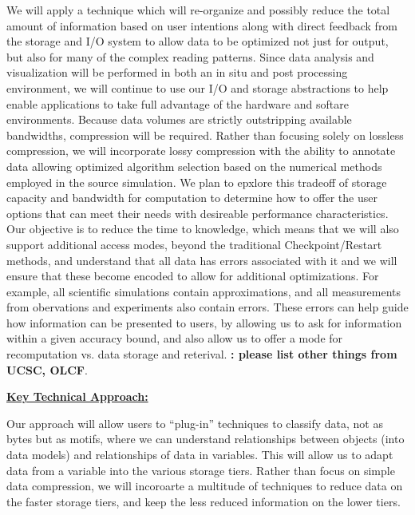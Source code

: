 \documentclass[11pt,letterpaper]{article}
\begin{document}
%
We will apply a technique which will re-organize and possibly reduce the total amount of information based on user intentions along
with direct feedback from the storage and I/O system to allow data to be optimized not just for output, but also for many of the complex
reading patterns. Since data analysis and visualization will be performed in both an in situ and post processing environment, 
we will continue to use our I/O and storage abstractions to help enable applications to take full advantage of the hardware and softare 
environments. Because data volumes are strictly outstripping available bandwidths, compression will
be required. Rather than focusing solely on lossless compression, we will
incorporate lossy compression with the ability to annotate data allowing
optimized algorithm selection based on the numerical methods employed in the
source simulation. We plan to epxlore this tradeoff of storage capacity and
bandwidth for computation to determine how to offer the user options that can
meet their needs with desireable performance characteristics.
%
Our objective is to reduce the time to knowledge, which means that we will also support additional access modes, beyond the traditional 
Checkpoint/Restart methods, and understand that all data has errors associated with it and we will ensure that these become encoded to allow
for additional optimizations. For example, all scientific simulations contain approximations, and all measurements from obervations and experiments 
also contain errors. These errors can help guide how information can be presented to users, by allowing us to ask for information within a given 
accuracy bound, and also allow us to offer a mode for recomputation vs. data storage and reterival.  
%
{\bf: please list other things from UCSC, OLCF}.
%


\underline{\textbf{Key Technical Approach:}}

Our approach will allow users to ``plug-in'' techniques to classify data, not as bytes but as motifs, where
we can understand relationships between objects (into data models) and relationships of data in variables.
This will allow us to adapt data from a variable into the various storage tiers. Rather than focus on simple data
compression, we will incoroarte a multitude of techniques to reduce data on the faster storage tiers, and keep the less
reduced information on the lower tiers.
\end{document}

